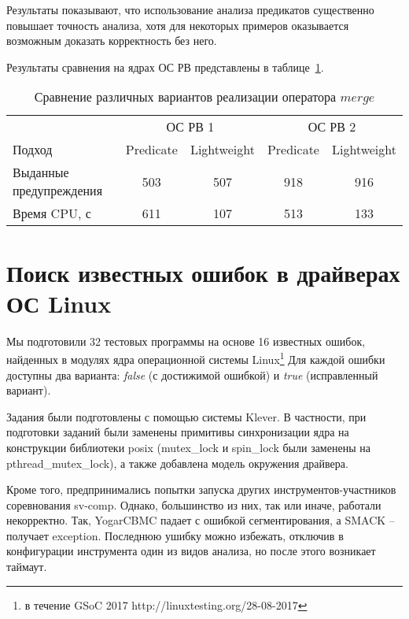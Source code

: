 Результаты показывают, что использование анализа предикатов существенно повышает точность анализа, хотя для некоторых примеров оказывается возможным доказать корректность без него.


Результаты сравнения на ядрах ОС РВ представлены в таблице~\ref{table-os-predicate}.

  \begin{table}[h] \footnotesize \centering
    \caption{Сравнение различных вариантов реализации оператора $merge$}
  	\label{table-os-predicate}
    \begin{tabular}{ | l | c | c | c | c |  }
      \hline
      		& 			 \multicolumn{2}{|c|}{ОС РВ 1} & 	\multicolumn{2}{|c|}{ОС РВ 2}\\
      Подход         					& Predicate  & Lightweight 	& Predicate  & Lightweight 	\\ \hline
      Выданные предупреждения			& 503   	& 507    		& 918   	& 916  			\\ 
  	  Время CPU, с 						& 611   	& 107  			& 513   	& 133  		\\ 
      \hline
    \end{tabular}
  \end{table}


\section{Поиск известных ошибок в драйверах ОС Linux}
Мы подготовили 32 тестовых программы на основе 16 известных ошибок, найденных в модулях ядра операционной системы Linux\footnote{в течение GSoC 2017 http://linuxtesting.org/28-08-2017}
Для каждой ошибки доступны два варианта: {\em false} (с достижимой ошибкой) и {\em true} (исправленный вариант).

Задания были подготовлены с помощью системы Klever. В частности, при подготовки заданий были заменены примитивы синхронизации ядра на конструкции библиотеки posix (mutex\_lock и spin\_lock были заменены на pthread\_mutex\_lock), а также добавлена модель окружения драйвера.

Кроме того, предпринимались попытки запуска других инструментов-участников соревнования sv-comp. 
Однако, большинство из них, так или иначе, работали некорректно. 
Так, YogarCBMC падает с ошибкой сегментирования, а SMACK -- получает exception. Последнюю ушибку можно избежать, отключив в конфигурации инструмента один из видов анализа, но после этого возникает таймаут.


